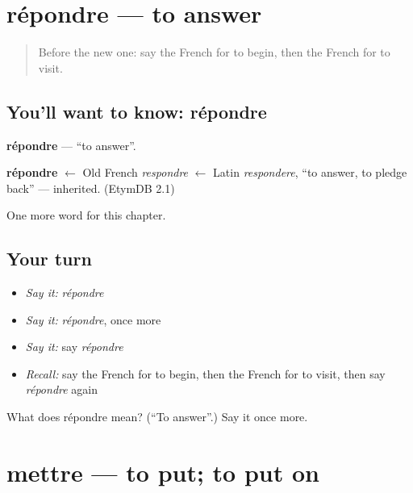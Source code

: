 \section[répondre]{répondre — to answer}

\label{lesson:FR-C137-repondre}



\begin{quote}
Before the new one: say the French for to begin, then the French for to visit.
\end{quote}

\subsection*{You'll want to know: répondre}
\textbf{répondre} — \textquotedblleft{}to answer\textquotedblright{}.

\begin{cousinweb}
\textbf{répondre} $\leftarrow$ Old French \emph{respondre} $\leftarrow$ Latin \emph{respondere}, \textquotedblleft{}to answer, to pledge back\textquotedblright{} — inherited. (EtymDB 2.1)
\end{cousinweb}

\begin{grammarlens}[title={What you've built}]
One more word for this chapter.
\end{grammarlens}

\subsection*{Your turn}
\begin{itemize}
\raggedright
  \item \emph{Say it:} \emph{répondre}
  \item \emph{Say it:} \emph{répondre}, once more
  \item \emph{Say it:} say \emph{répondre}
  \item \emph{Recall:} say the French for to begin, then the French for to visit, then say \emph{répondre} again
\end{itemize}

\begin{tcolorbox}[breakable,colback=teal!4,colframe=teal!35!black,title={Before you move on}]
What does répondre mean? (\textquotedblleft{}To answer\textquotedblright{}.) Say it once more.
\end{tcolorbox}
\section[mettre]{mettre — to put; to put on}

